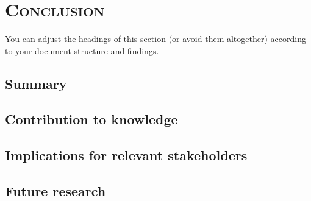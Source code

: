%
%
% 
% 
% 

\chapter{\textsc{Conclusion}}
\label{chap:conclusion}
You can adjust the headings of this section (or avoid them altogether) according to your document structure and findings. 

\section{Summary}
\label{sec:summary}

\section{Contribution to knowledge}
\label{sec:contribution}

\section{Implications for relevant stakeholders}
\label{sec:impact}

\section{Future research}
\label{sec:futurework}
